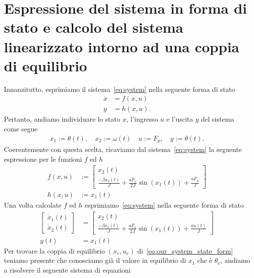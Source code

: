 \documentclass[a4paper, 11pt]{article}
\begin{document}
\section{Espressione del sistema in forma di stato e calcolo del sistema linearizzato intorno ad una coppia di equilibrio}

Innanzitutto, esprimiamo il sistema~\eqref{eq:system} nella seguente forma di stato
%
\begin{align*}
	\dot{x} &= f(x,u)
	\\
	y &= h(x,u).
\end{align*}
%
Pertanto, andiamo individuare lo stato $x$, l'ingresso $u$ e l'uscita $y$ del sistema come segue 
%
\begin{align*}
	x_{1} := \theta(t), \quad x_2 := \omega(t) \quad u := F_p, \quad y := \theta(t).
\end{align*}
%
Coerentemente con questa scelta, ricaviamo dal sistema~\eqref{eq:system} la seguente espressione per le funzioni $f$ ed $h$
%
\begin{align*}
	f(x,u) &:= \begin{bmatrix}
x_2(t)\\ \frac{ - \beta x_2(t)}{J} + \frac{a F_v}{2J}\sin{ (x_1(t)) } + \frac{a F_p} {J}
\end{bmatrix}
	\\
	h(x,u) &:= x_{1}(t)
\end{align*}
%
Una volta calcolate $f$ ed $h$ esprimiamo~\eqref{eq:system} nella seguente forma di stato
%
\begin{subequations}\label{eq:our_system_state_form}
\begin{align}
	\begin{bmatrix}
		\dot{x}_1(t)
		\\
		\dot{x}_2(t)
	\end{bmatrix} &= \begin{bmatrix}
x_2(t)\\ \frac{ - \beta x_2(t)}{J} + \frac{a F_v}{2J}\sin{ (x_1(t)) } + \frac{a u(t)} {J}
\end{bmatrix} \label{eq:state_form_1}
	\\
	y(t) &= x_1(t)
\end{align}
\end{subequations}
%
Per trovare la coppia di equilibrio $(x_e, u_e)$ di~\eqref{eq:our_system_state_form} teniamo presente che conosciamo già il valore in equilibrio di $x_1$ che è $\theta_e$, andiamo a risolvere il seguente sistema di equazioni
%
\end{document}
